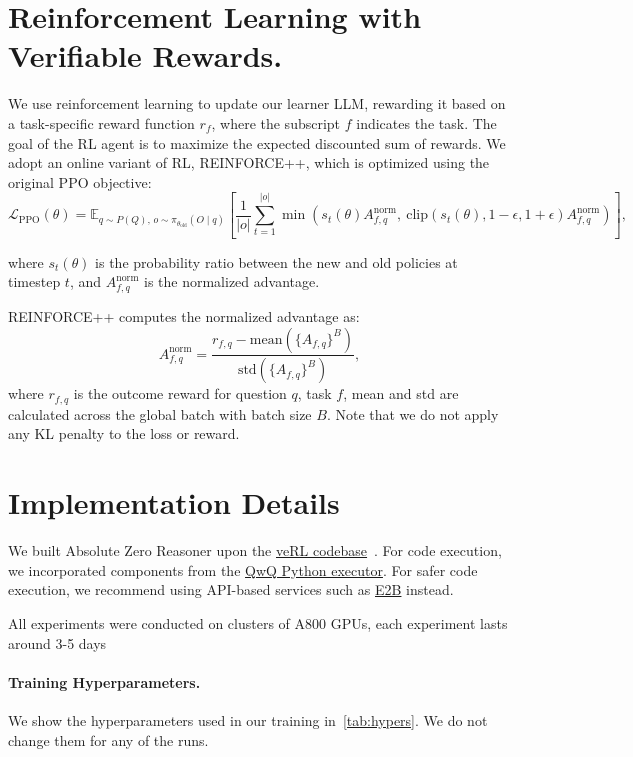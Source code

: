 \documentclass{article}
\begin{document}
\section{Reinforcement Learning with Verifiable Rewards.}\label{ref:rlvr} We use reinforcement learning to update our learner LLM, rewarding it based on a task-specific reward function \(r_f\), where the subscript \(f\) indicates the task. The goal of the RL agent is to maximize the expected discounted sum of rewards. We adopt an online variant of RL, REINFORCE++, which is optimized using the original PPO objective:
\begin{equation}
\mathcal{L}_{\text{PPO}}(\theta) = \mathbb{E}_{q \sim P(Q),\, o \sim \pi_{\theta_{\text{old}}}(O \mid q)} \left[ 
\frac{1}{|o|} \sum_{t=1}^{|o|} \min \left( s_t(\theta) A^{\text{norm}}_{f,q},\ \text{clip}\left(s_t(\theta), 1 - \epsilon, 1 + \epsilon\right) A^{\text{norm}}_{f,q} \right)
\right],
\end{equation}

where \(s_t(\theta)\) is the probability ratio between the new and old policies at timestep \(t\), and \(A^{\text{norm}}_{f,q}\) is the normalized advantage.

REINFORCE++ computes the normalized advantage as:
\begin{equation}
A^{\text{norm}}_{f,q} = \frac{r_{f,q} - \text{mean}(\{A_{f,q}\}^B)}{\text{std}(\{A_{f,q}\}^B)},
\end{equation}
where \(r_{f,q}\) is the outcome reward for question \(q\), task \(f\), mean and std are calculated across the global batch with batch size \(B\). Note that we do not apply any KL penalty to the loss or reward.

\section{Implementation Details}
We built Absolute Zero Reasoner upon the \href{https://github.com/volcengine/verl}{veRL codebase}~\citep{sheng2024hybridflow}. For code execution, we incorporated components from the \href{https://github.com/QwenLM/QwQ/blob/main/eval/eval/math_opensource_utils/python_executor.py}{QwQ Python executor}. For safer code execution, we recommend using API-based services such as \href{https://e2b.dev/}{E2B}  instead.

All experiments were conducted on clusters of A800 GPUs, each experiment lasts around 3-5 days

\paragraph{Training Hyperparameters.} We show the hyperparameters used in our training in~\cref{tab:hypers}. We do not change them for any of the runs.
\end{document}
